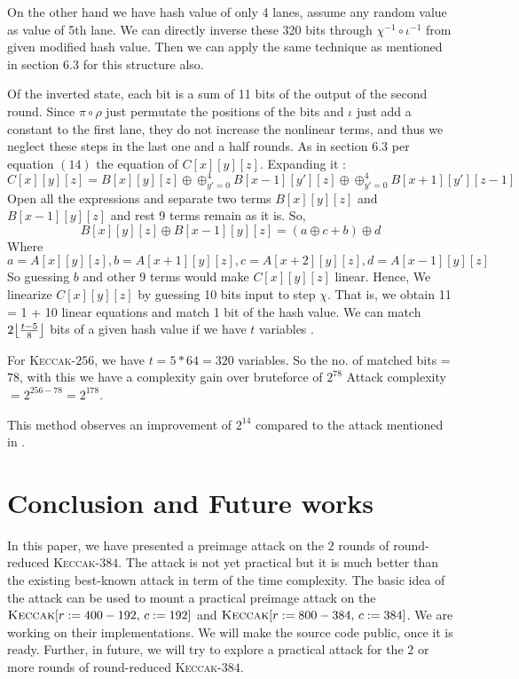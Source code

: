 \documentclass[runningheads]{llncs}
\DeclarePairedDelimiter\floor{\lfloor}{\rfloor}
\newcommand{\KECCAK}{\mbox{\textsc{Keccak}}}
\newcommand{\Keccak}{\mbox{\textsc{Keccak}}}
\begin{document}
On the other hand we have hash value of only 4 lanes, assume any random value as value of 5th lane.
We can directly inverse these 320 bits through $\chi^{-1} \circ \iota^{-1}$ from given modified hash value.
Then we can apply the same technique as mentioned in section 6.3 \cite{guo2016linear} for this structure also. 

Of the inverted state, each bit is a sum of 11 bits of the output of the second round. Since $\pi \circ \rho$ just permutate the positions of the bits and $\iota$ just add a constant to the first lane, they do not increase the nonlinear terms, and thus we neglect these steps in the last one and a half rounds. As in section 6.3 per equation $(14)$ the equation of $C[x][y][z]$. Expanding it :
    \[
        C[x][y][z] = B[x][y][z] \oplus \oplus_{y' = 0}^{4} B[x-1][y'][z] \oplus \oplus_{y' = 0}^{4} B[x+1][y'][z-1]
    \]
    Open all the expressions and separate two terms $B[x][y][z]$ and $B[x-1][y][z]$ and rest 9 terms remain as it is.
    So, \[ B[x][y][z] \oplus B[x-1][y][z] = (a \oplus c + b) \oplus d
    \]
    Where \[
        a = A[x][y][z], b = A[x + 1][y][z], c = A[x + 2][y][z], d = A[x - 1][y][z]
    \]
    So guessing $b$ and other 9 terms would make $C[x][y][z]$ linear. Hence, We linearize $C[x][y][z]$ by guessing 10 bits input to step $\chi$. That is, we obtain 11 = 1 + 10 linear equations and match 1 bit of the hash value.
We can match $2\floor*{\frac{t - 5}{8}}$ bits of a given hash value if we have $t$ variables \cite{guo2016linear}.

For \Keccak-$256$, we have $t = 5*64 = 320$ variables.
So the no. of matched bits = $78$, with this we have a complexity gain over bruteforce of $2^{78}$
Attack complexity $ = 2^{256 - 78} = 2^{178}$.

This method observes an improvement of $2^{14}$ compared to the attack mentioned in \cite{guo2016linear}.

\section{Conclusion and Future works}
In this paper, we have presented a preimage attack on the $2$ rounds of round-reduced \KECCAK-$384$. The attack is not yet practical but it is much better than the existing best-known attack in term of the time complexity. The basic idea of the attack can be used to mount a practical preimage attack on the $\Keccak[r:=400-192,\, c:=192]$ and $\Keccak[r:=800-384,\,c:=384]$. 
We are working on their implementations. We will make the source code public, once it is ready. 
Further, in future, we will try to explore a practical attack for the $2$ or more rounds of round-reduced \KECCAK-$384$.
\end{document}
